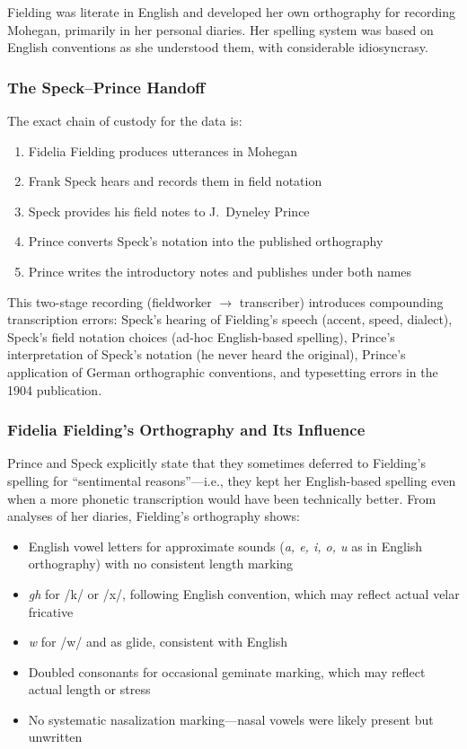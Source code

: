 Fielding was literate in English and developed her own orthography for
recording Mohegan, primarily in her personal diaries. Her spelling system
was based on English conventions as she understood them, with considerable
idiosyncrasy.

\subsubsection{The Speck--Prince Handoff}

The exact chain of custody for the data is:

\begin{enumerate}
  \item Fidelia Fielding produces utterances in Mohegan
  \item Frank Speck hears and records them in field notation
  \item Speck provides his field notes to J.\ Dyneley Prince
  \item Prince converts Speck's notation into the published orthography
  \item Prince writes the introductory notes and publishes under both names
\end{enumerate}

This two-stage recording (fieldworker $\rightarrow$ transcriber) introduces
compounding transcription errors: Speck's hearing of Fielding's speech
(accent, speed, dialect), Speck's field notation choices (ad-hoc English-based
spelling), Prince's interpretation of Speck's notation (he never heard the
original), Prince's application of German orthographic conventions, and
typesetting errors in the 1904 publication.

\subsubsection{Fidelia Fielding's Orthography and Its Influence}

Prince and Speck explicitly state that they sometimes deferred to Fielding's
spelling for ``sentimental reasons''---i.e., they kept her English-based
spelling even when a more phonetic transcription would have been technically
better. From analyses of her diaries, Fielding's orthography shows:

\begin{itemize}
  \item English vowel letters for approximate sounds (\textit{a, e, i, o, u}
    as in English orthography) with no consistent length marking
  \item \textit{gh} for /k/ or /x/, following English convention, which may
    reflect actual velar fricative
  \item \textit{w} for /w/ and as glide, consistent with English
  \item Doubled consonants for occasional geminate marking, which may reflect
    actual length or stress
  \item No systematic nasalization marking---nasal vowels were likely present
    but unwritten
\end{itemize}

